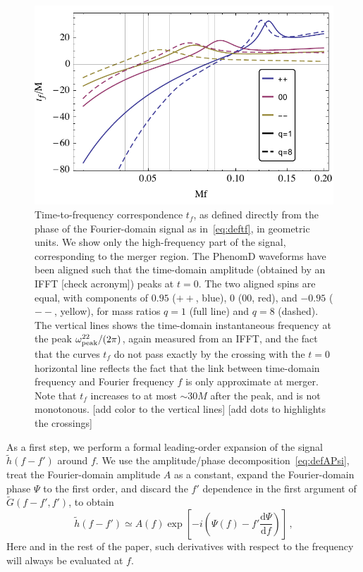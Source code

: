 \documentclass[aps,showpacs,twocolumn,
prd,superscriptaddress,nofootinbib]{revtex4-1}
\newcommand{\be}{\begin{equation}}
\newcommand{\ee}{\end{equation}}
\newcommand\ud{{\mathrm{d}}}
\newcommand{\SM}[1]{{\color{Red} #1}}
\begin{document}
\begin{figure}
  \centering
  \includegraphics[width=.98\linewidth]{plots/tf.pdf}
  \caption{Time-to-frequency correspondence $t_{f}$, as defined directly from the phase of the Fourier-domain signal as in~\eqref{eq:deftf}, in geometric units. We show only the high-frequency part of the signal, corresponding to the merger region. The PhenomD waveforms have been aligned such that the time-domain amplitude (obtained by an IFFT \SM{[check acronym]}) peaks at $t=0$. The two aligned spins are equal, with components of $0.95$ ($++$, blue), $0$ ($00$, red), and $-0.95$ ($--$, yellow), for mass ratios $q=1$ (full line) and $q=8$ (dashed). The vertical lines shows the time-domain instantaneous frequency at the peak $\omega^{22}_{\rm peak}/(2\pi)$, again measured from an IFFT, and the fact that the curves $t_{f}$ do not pass exactly by the crossing with the $t=0$ horizontal line reflects the fact that the link between time-domain frequency and Fourier frequency $f$ is only approximate at merger. Note that $t_{f}$ increases to at most $\sim 30M$ after the peak, and is not monotonous. \SM{[add color to the vertical lines]} \SM{[add dots to highlights the crossings]}}
  \label{fig:tf}
\end{figure}

As a first step, we perform a formal leading-order expansion of the signal $\tilde{h}(f-f')$ around $f$. We use the amplitude/phase decomposition~\eqref{eq:defAPsi}, treat the Fourier-domain amplitude $A$ as a constant, expand the Fourier-domain phase $\Psi$ to the first order, and discard the $f'$ dependence in the first argument of $\tilde{G}(f-f', f')$, to obtain
\be
	\tilde{h}(f-f') \simeq A(f) \exp\left[ -i\left( \Psi(f) - f' \frac{\ud \Psi}{\ud f} \right) \right] \,,
\ee
Here and in the rest of the paper, such derivatives with respect to the frequency will always be evaluated at $f$.
\end{document}
